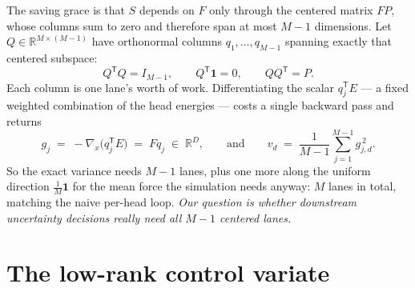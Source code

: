 \documentclass{article}
\begin{document}
The saving grace is that $S$ depends on $F$ only through the centered matrix $FP$, whose columns sum
to zero and therefore span at most $M-1$ dimensions. Let $Q\in\mathbb{R}^{M\times(M-1)}$ have
orthonormal columns $q_1,\dots,q_{M-1}$ spanning exactly that centered subspace:
\begin{equation*}
Q^{\mathsf T}Q=I_{M-1},\qquad Q^{\mathsf T}\mathbf 1=0,\qquad QQ^{\mathsf T}=P .
\end{equation*}
Each column is one lane's worth of work. Differentiating the scalar $q_j^{\mathsf T}E$ --- a fixed
weighted combination of the head energies --- costs a single backward pass and returns
\begin{equation}
g_j\;=\;-\nabla_x\bigl(q_j^{\mathsf T}E\bigr)\;=\;Fq_j\;\in\;\mathbb{R}^{D},
\qquad\text{and}\qquad
v_d\;=\;\frac{1}{M-1}\sum_{j=1}^{M-1} g_{j,d}^{\,2} .
\end{equation}
So the exact variance needs $M-1$ lanes, plus one more along the uniform direction
$\tfrac1M\mathbf 1$ for the mean force the simulation needs anyway: $M$ lanes in total, matching the
naive per-head loop. \emph{Our question is whether downstream uncertainty decisions really need all
$M-1$ centered lanes.}


\section{The low-rank control variate}
\label{app:cv}
\end{document}

